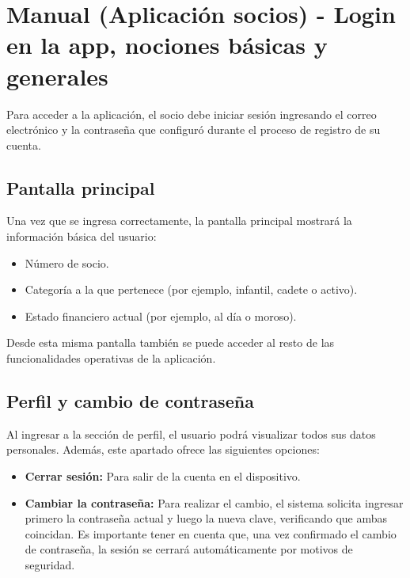 \section{Manual (Aplicación socios) - Login en la app, nociones básicas y generales}

Para acceder a la aplicación, el socio debe iniciar sesión ingresando el correo electrónico y la contraseña que configuró durante el proceso de registro de su cuenta.

\subsection{Pantalla principal}
Una vez que se ingresa correctamente, la pantalla principal mostrará la información básica del usuario:
\begin{itemize}
    \item Número de socio.
    \item Categoría a la que pertenece (por ejemplo, infantil, cadete o activo).
    \item Estado financiero actual (por ejemplo, al día o moroso).
\end{itemize}
Desde esta misma pantalla también se puede acceder al resto de las funcionalidades operativas de la aplicación.

\subsection{Perfil y cambio de contraseña}
Al ingresar a la sección de perfil, el usuario podrá visualizar todos sus datos personales. Además, este apartado ofrece las siguientes opciones:
\begin{itemize}
    \item \textbf{Cerrar sesión:} Para salir de la cuenta en el dispositivo.
    \item \textbf{Cambiar la contraseña:} Para realizar el cambio, el sistema solicita ingresar primero la contraseña actual y luego la nueva clave, verificando que ambas coincidan. Es importante tener en cuenta que, una vez confirmado el cambio de contraseña, la sesión se cerrará automáticamente por motivos de seguridad.
\end{itemize}
